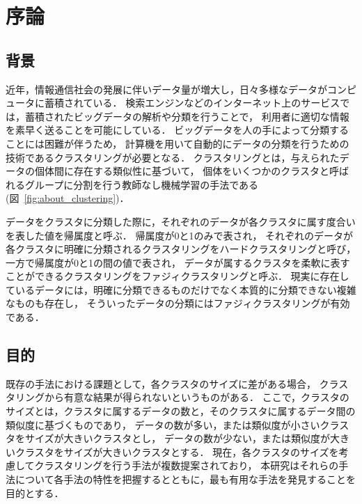 \documentclass[a4j,12pt,dvipdfmx,oneside]{jsbook}
\theoremstyle{definition}
\begin{document}
\pagestyle{headings}
\def\thepage{\roman{page}}

\tableofcontents
\listoffigures
\listoftables
\newpage
\pagestyle{myheadings}

\chapter{序論}
\def\thepage{\arabic{page}}
\setcounter{page}{1}
\label{chap:first}

 \section{背景}\label{sec:background}
 
 近年，情報通信社会の発展に伴いデータ量が増大し，日々多様なデータがコンピュータに蓄積されている．
 検索エンジンなどのインターネット上のサービスでは，蓄積されたビッグデータの解析や分類を行うことで，
 利用者に適切な情報を素早く送ることを可能にしている．
 ビッグデータを人の手によって分類することには困難が伴うため，
 計算機を用いて自動的にデータの分類を行うための技術であるクラスタリングが必要となる．
 クラスタリングとは，与えられたデータの個体間に存在する類似性に基づいて，
 個体をいくつかのクラスタと呼ばれるグループに分割を行う教師なし機械学習の手法である(図~\ref{fig:about_clustering})．
 
 データをクラスタに分類した際に，それぞれのデータが各クラスタに属す度合いを表した値を帰属度と呼ぶ．
 帰属度が0と1のみで表され，
 それぞれのデータが各クラスタに明確に分類されるクラスタリングをハードクラスタリングと呼び，
 一方で帰属度が0と1の間の値で表され，
 データが属するクラスタを柔軟に表すことができるクラスタリングをファジィクラスタリングと呼ぶ．
 現実に存在しているデータには，明確に分類できるものだけでなく本質的に分類できない複雑なものも存在し，
 そういったデータの分類にはファジィクラスタリングが有効である．

 \section{目的}\label{sec:purpose}

 既存の手法における課題として，各クラスタのサイズに差がある場合，
 クラスタリングから有意な結果が得られないというものがある．
 ここで，クラスタのサイズとは，クラスタに属するデータの数と，そのクラスタに属するデータ間の類似度に基づくものであり，
 データの数が多い，または類似度が小さいクラスタをサイズが大きいクラスタとし，
 データの数が少ない，または類似度が大きいクラスタをサイズが大きいクラスタとする．
 現在，各クラスタのサイズを考慮してクラスタリングを行う手法が複数提案されており，
 本研究はそれらの手法について各手法の特性を把握するとともに，最も有用な手法を発見することを目的とする．
\end{document}
